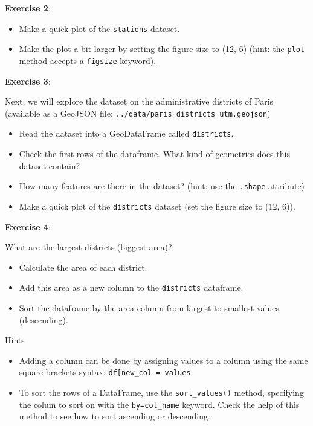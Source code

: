 \documentclass[
  letterpaper,
  DIV=11,
  numbers=noendperiod]{scrreprt}
\providecommand{\tightlist}{%
  \setlength{\itemsep}{0pt}\setlength{\parskip}{0pt}}\usepackage{longtable,booktabs,array}
\begin{document}
\textbf{Exercise 2}:

\begin{itemize}
\tightlist
\item
  Make a quick plot of the \texttt{stations} dataset.
\item
  Make the plot a bit larger by setting the figure size to (12, 6)
  (hint: the \texttt{plot} method accepts a \texttt{figsize} keyword).
\end{itemize}

\textbf{Exercise 3}:

Next, we will explore the dataset on the administrative districts of
Paris (available as a GeoJSON file:
\texttt{../data/paris\_districts\_utm.geojson})

\begin{itemize}
\tightlist
\item
  Read the dataset into a GeoDataFrame called \texttt{districts}.
\item
  Check the first rows of the dataframe. What kind of geometries does
  this dataset contain?
\item
  How many features are there in the dataset? (hint: use the
  \texttt{.shape} attribute)
\item
  Make a quick plot of the \texttt{districts} dataset (set the figure
  size to (12, 6)).
\end{itemize}

\textbf{Exercise 4}:

What are the largest districts (biggest area)?

\begin{itemize}
\tightlist
\item
  Calculate the area of each district.
\item
  Add this area as a new column to the \texttt{districts} dataframe.
\item
  Sort the dataframe by the area column from largest to smallest values
  (descending).
\end{itemize}

Hints

\begin{itemize}
\tightlist
\item
  Adding a column can be done by assigning values to a column using the
  same square brackets syntax:
  \texttt{df{[}\textquotesingle{}new\_col\textquotesingle{}{]}\ =\ values}
\item
  To sort the rows of a DataFrame, use the \texttt{sort\_values()}
  method, specifying the colum to sort on with the
  \texttt{by=\textquotesingle{}col\_name\textquotesingle{}} keyword.
  Check the help of this method to see how to sort ascending or
  descending.
\end{itemize}
\end{document}
